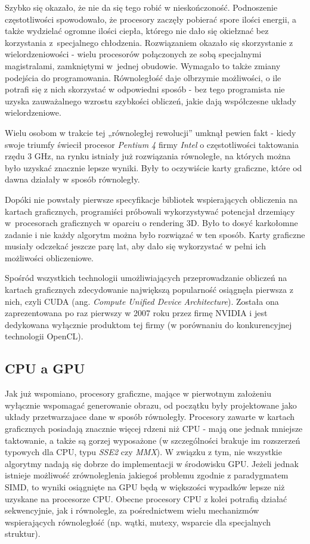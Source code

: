 \documentclass[12pt]{article}
\begin{document}
Szybko się okazało, że nie da się tego robić w nieskończoność. Podnoszenie częstotliwości spowodowało, że procesory zaczęły pobierać spore ilości energii, a także wydzielać ogromne ilości ciepła, którego nie dało się okiełznać bez korzystania z~specjalnego chłodzenia. Rozwiązaniem okazało się skorzystanie z wielordzeniowości - wielu procesorów połączonych ze sobą specjalnymi magistralami, zamkniętymi w~jednej obudowie. Wymagało to także zmiany podejścia do programowania. Równoległość daje olbrzymie możliwości, o ile potrafi się z nich skorzystać w odpowiedni sposób - bez tego programista nie uzyska zauważalnego wzrostu szybkości obliczeń, jakie dają współczesne układy wielordzeniowe. 

Wielu osobom w trakcie tej „równoległej rewolucji” umknął pewien fakt - kiedy swoje triumfy świecił procesor \textit{Pentium 4} firmy \textit{Intel} o częstotliwości taktowania rzędu 3 GHz, na rynku istniały już rozwiązania równoległe, na których można było uzyskać znacznie lepsze wyniki. Były to oczywiście karty graficzne, które od dawna działały w sposób równoległy. 

Dopóki nie powstały pierwsze specyfikacje bibliotek wspierających obliczenia na kartach graficznych, programiści próbowali wykorzystywać potencjał drzemiący w~procesorach graficznych w oparciu o rendering 3D. Było to dosyć karkołomne zadanie i nie każdy algorytm można było rozwiązać w ten sposób. Karty graficzne musiały odczekać jeszcze parę lat, aby dało się wykorzystać w pełni ich możliwości obliczeniowe.

Spośród wszystkich technologii umożliwiających przeprowadzanie obliczeń na kartach graficznych zdecydowanie największą popularność osiągnęła pierwsza z nich, czyli CUDA (ang. \textit{Compute Unified Device Architecture}). Została ona zaprezentowana po raz pierwszy w 2007 roku przez firmę NVIDIA i jest dedykowana wyłącznie produktom tej firmy (w porównaniu do konkurencyjnej technologii OpenCL).

\subsection{CPU a GPU}

Jak już wspomiano, procesory graficzne, mające w pierwotnym założeniu wyłącznie wspomagać generowanie obrazu, od początku były projektowane jako układy przetwarzajace dane w sposób równoległy. Procesory zawarte w kartach graficznych posiadają znacznie więcej rdzeni niż CPU - mają one jednak mniejsze taktowanie, a także są gorzej wyposażone (w szczególności brakuje im rozszerzeń typowych dla CPU, typu \textit{SSE2} czy \textit{MMX}). W związku z tym, nie wszystkie algorytmy nadają się dobrze do implementacji w środowisku GPU. Jeżeli jednak istnieje możliwość zrównoleglenia jakiegoś problemu zgodnie z paradygmatem SIMD, to wyniki osiągnięte na GPU będą w większości wypadków lepsze niż uzyskane na procesorze CPU. Obecne procesory CPU z kolei potrafią działać sekwencyjnie, jak i równolegle, za pośrednictwem wielu mechanizmów wspierających równoległość (np. wątki, mutexy, wsparcie dla specjalnych struktur).
\end{document}
